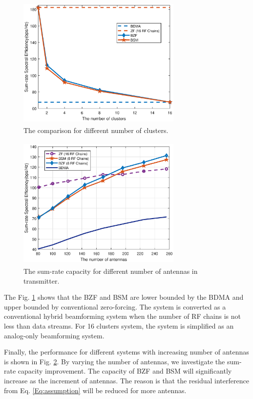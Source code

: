 \documentclass[conference]{IEEEtran}
\begin{document}
{\begin{figure}[ht]
	\begin{center}
		\includegraphics[width=3.2in,height=2.6in]{Figure/differentK1path.eps}
		\caption{The comparison for different number of clusters.}\label{fig:differentK}
	\end{center}
\end{figure}

\begin{figure}[ht]
	\begin{center}
		\includegraphics[width=3.2in,height=2.6in]{Figure/antenna1path.eps}
		\caption{The sum-rate capacity for different number of antennas in transmitter.}\label{fig:CDF}
	\end{center}
\end{figure}


The Fig. \ref{fig:differentK} shows that the BZF and BSM are lower bounded by the BDMA and upper bounded by conventional zero-forcing. The system is converted as a conventional hybrid beamforming system when the number of RF chains is not less than data streams. For 16 clusters system, the system is simplified as an analog-only  beamforming system.

Finally, the performance for different systems with increasing number of antennas is shown in Fig. \ref{fig:CDF}. By varying the number of antennas, we investigate the sum-rate capacity improvement. The capacity of BZF and BSM will significantly increase as the increment of antennas. The reason is that the residual interference from Eq. \eqref{Eq:assumption} will be reduced for more antennas.

}
\end{document}
